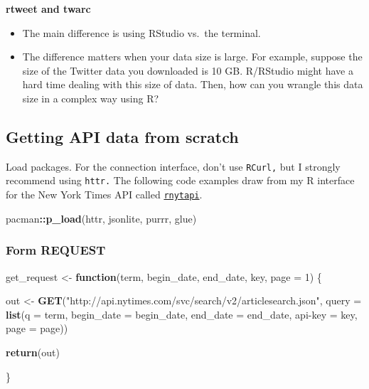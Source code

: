 \documentclass[
]{book}
\newenvironment{Shaded}{\begin{snugshade}}{\end{snugshade}}
\newcommand{\AttributeTok}[1]{\textcolor[rgb]{0.13,0.29,0.53}{#1}}
\newcommand{\ControlFlowTok}[1]{\textcolor[rgb]{0.13,0.29,0.53}{\textbf{#1}}}
\newcommand{\DecValTok}[1]{\textcolor[rgb]{0.00,0.00,0.81}{#1}}
\newcommand{\FunctionTok}[1]{\textcolor[rgb]{0.13,0.29,0.53}{\textbf{#1}}}
\newcommand{\NormalTok}[1]{#1}
\newcommand{\OtherTok}[1]{\textcolor[rgb]{0.56,0.35,0.01}{#1}}
\newcommand{\SpecialCharTok}[1]{\textcolor[rgb]{0.81,0.36,0.00}{\textbf{#1}}}
\newcommand{\StringTok}[1]{\textcolor[rgb]{0.31,0.60,0.02}{#1}}
\begin{document}
\textbf{rtweet and twarc}

\begin{itemize}
\item
  The main difference is using RStudio vs.~the terminal.
\item
  The difference matters when your data size is large. For example, suppose the size of the Twitter data you downloaded is 10 GB. R/RStudio might have a hard time dealing with this size of data. Then, how can you wrangle this data size in a complex way using R?
\end{itemize}

\subsection{Getting API data from scratch}\label{getting-api-data-from-scratch}

Load packages. For the connection interface, don't use \texttt{RCurl,} but I strongly recommend using \texttt{httr.} The following code examples draw from my R interface for the New York Times API called \href{https://jaeyk.github.io/rnytapi/}{\texttt{rnytapi}}.

\begin{Shaded}
\begin{Highlighting}[]
\NormalTok{pacman}\SpecialCharTok{::}\FunctionTok{p\_load}\NormalTok{(httr, jsonlite, purrr, glue)}
\end{Highlighting}
\end{Shaded}

\subsubsection{Form REQUEST}\label{form-request}

\begin{Shaded}
\begin{Highlighting}[]
\NormalTok{get\_request }\OtherTok{\textless{}{-}} \ControlFlowTok{function}\NormalTok{(term, begin\_date, end\_date, key, }\AttributeTok{page =} \DecValTok{1}\NormalTok{) \{}

\NormalTok{    out }\OtherTok{\textless{}{-}} \FunctionTok{GET}\NormalTok{(}\StringTok{"http://api.nytimes.com/svc/search/v2/articlesearch.json"}\NormalTok{,}
        \AttributeTok{query =} \FunctionTok{list}\NormalTok{(}\StringTok{\textquotesingle{}q\textquotesingle{}} \OtherTok{=}\NormalTok{ term,}
                     \StringTok{\textquotesingle{}begin\_date\textquotesingle{}} \OtherTok{=}\NormalTok{ begin\_date,}
                     \StringTok{\textquotesingle{}end\_date\textquotesingle{}} \OtherTok{=}\NormalTok{ end\_date,}
                     \StringTok{\textquotesingle{}api{-}key\textquotesingle{}} \OtherTok{=}\NormalTok{ key,}
                     \StringTok{\textquotesingle{}page\textquotesingle{}} \OtherTok{=}\NormalTok{ page))}

    \FunctionTok{return}\NormalTok{(out)}

\NormalTok{\}}
\end{Highlighting}
\end{Shaded}
\end{document}
